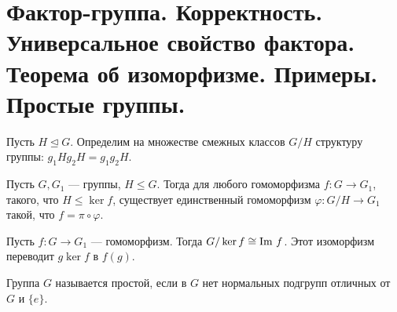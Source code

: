% 
% 
\section{Фактор-группа. Корректность. Универсальное свойство фактора. Теорема об изоморфизме. Примеры. Простые группы.}
\begin{defn}
    Пусть $ H \trianglelefteq G$. Определим на множестве смежных классов  $ G / H$  структуру группы: $ g_1Hg_2H = g_1g_2H$.
\end{defn}
\begin{thm}
    Пусть $ G, G_1 $ --- группы, $ H \le G$. Тогда для любого гомоморфизма $ f\colon G \to G_1$, такого, что $ H \le \ker f$, существует единственный гомоморфизм $ \varphi \colon G / H \to  G_1$ такой, что $ f = \pi \circ \varphi $.
\end{thm}
\begin{thm}
    Пусть $ f\colon G \to  G_1$ --- гомоморфизм. Тогда $ G / \ker f \cong {\mathop{\text{\rm Im}}}~ f$. Этот изоморфизм переводит  $ g\ker f $ в  $ f(g)$.
\end{thm}
\begin{defn}
    Группа $ G$ называется  {\sf простой}, если  в $ G$ нет нормальных подгрупп отличных от  $ G$ и $ \{e\}$. 
\end{defn}
% 
